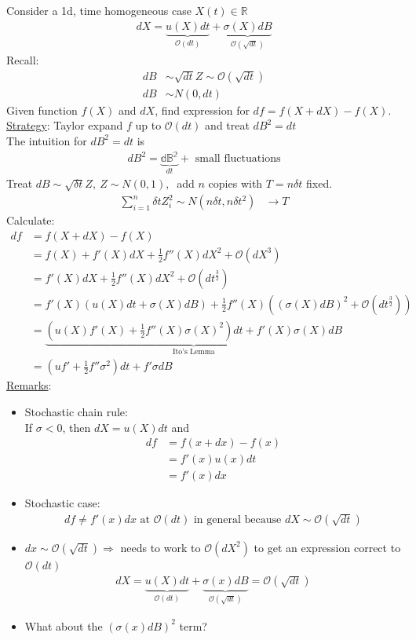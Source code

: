\documentclass[12pt, letterpaper]{article}
\begin{document}
Consider a 1d, time homogeneous case $X(t) \in \mathbb{R}$
\begin{align*}
    dX = \underbrace{u(X)dt}_{\mathcal{O}(dt)} + \underbrace{\sigma(X)dB}_{\mathcal{O}(\sqrt{dt})}
\end{align*}
Recall: 
\begin{align*}
    dB &\sim \sqrt{dt} Z \sim \mathcal{O}(\sqrt{dt}) \\
    dB &\sim N(0,dt)
\end{align*}
Given function $f(X)$ and $dX$, find expression for $df = f(X+dX) - f(X)$. \\
\underline{Strategy}: Taylor expand $f$ up to $\mathcal{O}(dt)$ and treat $dB^2=dt$ \\
The intuition for $dB^2 = dt$ is 
\begin{align*}
    dB^2 = \underbrace{\mathbb{dB^2}}_{dt} + \text{ small fluctuations}
\end{align*}
Treat $dB \sim \sqrt{\delta t}Z,\ Z\sim N(0,1),\ $ add $n$ copies with $T = n\delta t$ fixed.
\begin{align*}
    \sum_{i=1}^{n}\delta t Z^2_i \sim N(n\delta t, n\delta t^2) &\rightarrow T
\end{align*}
Calculate:
\begin{align*}
    df &= f(X + dX) - f(X) \\
    &= f(X) + f'(X)dX + \frac 12 f''(X)dX^2 + \mathcal{O}(dX^3) \\
    &= f'(X)dX + \frac 12 f''(X)dX^2 + \mathcal{O}(dt^\frac 32)\\
    &= f'(X)(u(X)dt + \sigma(X)dB) + \frac 12 f''(X) ((\sigma(X)dB)^2+\mathcal{O}(dt^\frac 32))\\
    &= \underbrace{(u(X)f'(X) + \frac 12 f''(X)\sigma(X)^2)dt + f'(X)\sigma(X)dB}_{\text{Ito's Lemma}} \\
    &= (uf'+ \frac 12 f''\sigma^2)dt + f'\sigma dB
\end{align*}
\underline{Remarks}:
\begin{itemize}
    \item Stochastic chain rule: \\
    If $\sigma < 0$, then $dX = u(X)dt$
    and \begin{align*}
        df &= f(x +dx) - f(x) \\
        &= f'(x)u(x)dt \\
        &= f'(x)dx
    \end{align*}
    \item Stochastic case:
    \begin{align*}
        df \ne f'(x)dx \text{ at } \mathcal{O}(dt) \text{ in general because } dX \sim \mathcal{O}(\sqrt{dt})  
    \end{align*}
    \item $dx \sim \mathcal{O}(\sqrt{dt}) \Rightarrow$ needs to work to $\mathcal{O}(dX^2)$ 
    to get an expression correct to $\mathcal{O}(dt)$
    \begin{align*}
        dX = \underbrace{u(X)dt}_{\mathcal{O}(dt)} + \underbrace{\sigma(x)dB}_{\mathcal{O}(\sqrt{dt})} = \mathcal{O}(\sqrt{dt})
    \end{align*}
    \item What about the $(\sigma(x)dB)^2$ term?
\end{itemize}
\end{document}
